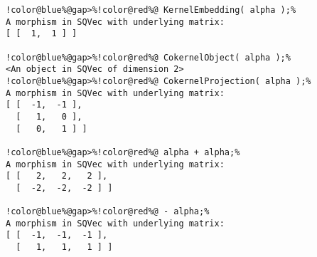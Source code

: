 \begin{Verbatim}[commandchars=!@\%,frame=single]
!color@blue%@gap>%!color@red%@ KernelEmbedding( alpha );%
A morphism in SQVec with underlying matrix:
[ [  1,  1 ] ]

!color@blue%@gap>%!color@red%@ CokernelObject( alpha );%
<An object in SQVec of dimension 2>
!color@blue%@gap>%!color@red%@ CokernelProjection( alpha );%
A morphism in SQVec with underlying matrix:
[ [  -1,  -1 ],
  [   1,   0 ],
  [   0,   1 ] ]

!color@blue%@gap>%!color@red%@ alpha + alpha;%
A morphism in SQVec with underlying matrix:
[ [   2,   2,   2 ],
  [  -2,  -2,  -2 ] ]

!color@blue%@gap>%!color@red%@ - alpha;%
A morphism in SQVec with underlying matrix:
[ [  -1,  -1,  -1 ],
  [   1,   1,   1 ] ]

\end{Verbatim}
